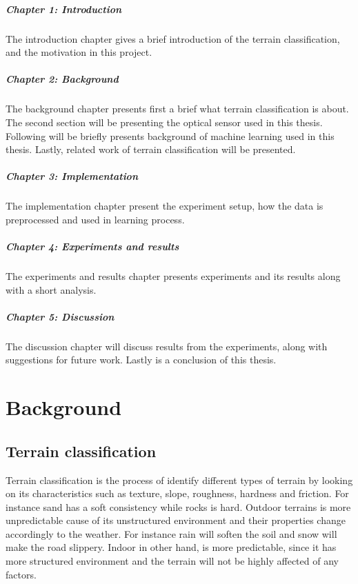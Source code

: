 \documentclass[USenglish]{ifimaster}  %
\begin{document}
\paragraph{Chapter 1: Introduction}
The introduction chapter gives a brief introduction of the terrain classification, and the motivation in this project.

\paragraph{Chapter 2: Background}
The background chapter presents first a brief what terrain classification is about. The second section will be presenting the optical sensor used in this thesis. Following will be briefly presents background of machine learning used in this thesis. Lastly, related work of terrain classification will be presented.

\paragraph{Chapter 3: Implementation}
The implementation chapter present the experiment setup, how the data is preprocessed and used in learning process.

\paragraph{Chapter 4: Experiments and results}
The experiments and results chapter presents experiments and its results along with a short analysis.

\paragraph{Chapter 5: Discussion}
The discussion chapter will discuss results from the experiments, along with suggestions for future work. Lastly is a conclusion of this thesis. 


\chapter{Background}                  %
\section{Terrain classification}
Terrain classification is the process of identify different types of terrain by looking on its characteristics such as texture, slope, roughness, hardness and friction. For instance sand has a soft consistency while rocks is hard. Outdoor terrains is more unpredictable cause of its unstructured environment and their properties change accordingly to the weather. For instance rain will soften the soil and snow will make the road slippery. Indoor in other hand, is more predictable, since it has more structured environment and the terrain will not be highly affected of any factors.
\end{document}
